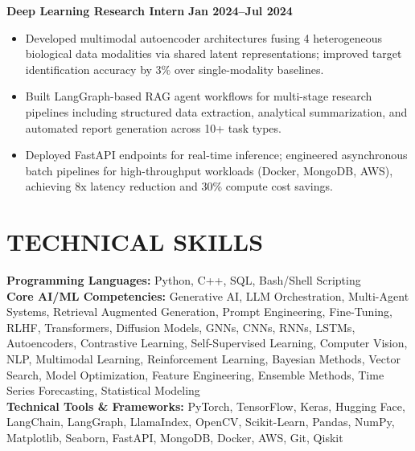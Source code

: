 \documentclass[a4paper,10pt]{article}
\begin{document}
\vspace{3pt}
\noindent\textbf{Deep Learning Research Intern} \hfill \textbf{Jan 2024--Jul 2024}
\begin{itemize}
    \vspace{-5pt}
    \item Developed multimodal autoencoder architectures fusing 4 heterogeneous biological data modalities via shared latent representations; improved target identification accuracy by 3\% over single-modality baselines. \vspace{-7pt}
    \item Built LangGraph-based RAG agent workflows for multi-stage research pipelines including structured data extraction, analytical summarization, and automated report generation across 10+ task types. \vspace{-7pt}
    \item Deployed FastAPI endpoints for real-time inference; engineered asynchronous batch pipelines for high-throughput workloads (Docker, MongoDB, AWS), achieving 8x latency reduction and 30\% compute cost savings. \vspace{-7pt}
\end{itemize}

\vspace{-1pt}

\section{\textbf{TECHNICAL SKILLS}}
\vspace{0pt}

\noindent\textbf{Programming Languages:} Python, C++, SQL, Bash/Shell Scripting \\
\textbf{Core AI/ML Competencies:} Generative AI, LLM Orchestration, Multi-Agent Systems, Retrieval Augmented Generation, Prompt Engineering, Fine-Tuning, RLHF, Transformers, Diffusion Models, GNNs, CNNs, RNNs, LSTMs, Autoencoders, Contrastive Learning, Self-Supervised Learning, Computer Vision, NLP, Multimodal Learning, Reinforcement Learning, Bayesian Methods, Vector Search, Model Optimization, Feature Engineering, Ensemble Methods, Time Series Forecasting, Statistical Modeling \\
\textbf{Technical Tools \& Frameworks:} PyTorch, TensorFlow, Keras, Hugging Face, LangChain, LangGraph, LlamaIndex, OpenCV, Scikit-Learn, Pandas, NumPy, Matplotlib, Seaborn, FastAPI, MongoDB, Docker, AWS, Git, Qiskit

\vspace{-1pt}
\end{document}
